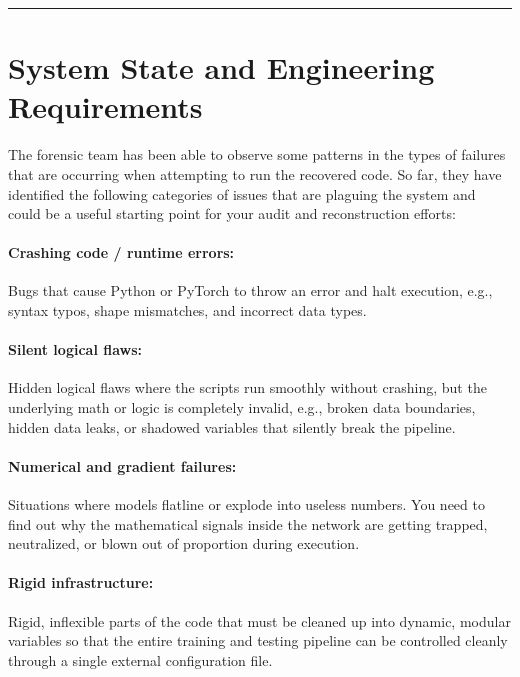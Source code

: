 \documentclass[11pt,a4paper]{article}
\begin{document}
\vspace{0.4cm}
\hrule

\section*{System State and Engineering Requirements}
The forensic team has been able to observe some patterns in the types of failures that are occurring when attempting to run the recovered code. So far, they have identified the following categories of issues that are plaguing the system and could be a useful starting point for your audit and reconstruction efforts:

\vspace{-0.4cm}
\paragraph{Crashing code / runtime errors:} Bugs that cause Python or PyTorch to throw an error and halt execution, e.g., syntax typos, shape mismatches, and incorrect data types.

\vspace{-0.4cm}
\paragraph{Silent logical flaws:} Hidden logical flaws where the scripts run smoothly without crashing, but the underlying math or logic is completely invalid, e.g., broken data boundaries, hidden data leaks, or shadowed variables that silently break the pipeline.

\vspace{-0.4cm}
\paragraph{Numerical and gradient failures:} Situations where models flatline or explode into useless numbers. You need to find out why the mathematical signals inside the network are getting trapped, neutralized, or blown out of proportion during execution.

\vspace{-0.4cm}
\paragraph{Rigid infrastructure:} Rigid, inflexible parts of the code that must be cleaned up into dynamic, modular variables so that the entire training and testing pipeline can be controlled cleanly through a single external configuration file.
\end{document}
